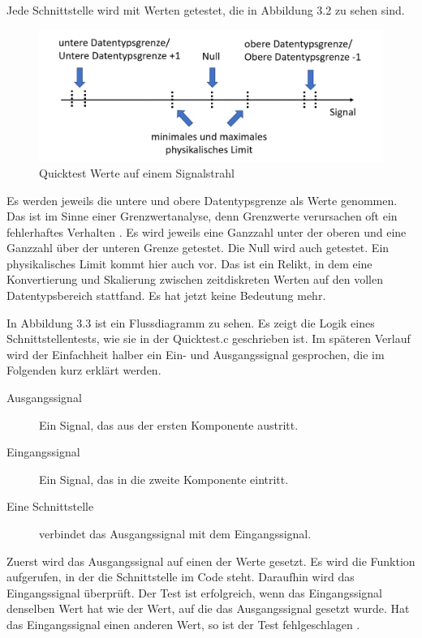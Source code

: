 Jede Schnittstelle wird mit Werten getestet, die in Abbildung 3.2 zu sehen sind.


\begin{figure}[h]
\centering
\includegraphics[scale=.9,]{Bilder/EquiZeitstrahl/QuicktestSignalstrahl.png}
\caption{Quicktest Werte auf einem Signalstrahl \parencite[]{quicktestc}}
\end{figure}
Es werden jeweils die untere und obere Datentypsgrenze als Werte genommen. Das ist im Sinne einer Grenzwertanalyse, denn
Grenzwerte verursachen oft ein fehlerhaftes Verhalten \parencite[S. 36]{integration}. 
Es wird jeweils eine Ganzzahl unter der oberen und eine Ganzzahl über der unteren Grenze getestet. Die Null wird auch getestet.
Ein physikalisches Limit kommt hier auch vor. Das ist ein Relikt, in dem eine Konvertierung und Skalierung zwischen zeitdiskreten Werten auf den vollen
Datentypsbereich stattfand. Es hat jetzt keine Bedeutung mehr.\par%

In Abbildung 3.3 ist ein Flussdiagramm zu sehen. Es zeigt die Logik eines Schnittstellentests, wie sie in der Quicktest.c 
geschrieben ist. 
Im späteren Verlauf wird der Einfachheit halber ein Ein- und Ausgangssignal gesprochen, die im Folgenden kurz erklärt werden.
\begin{description}
\item[Ausgangssignal] Ein Signal, das aus der ersten Komponente austritt.
\item[Eingangssignal] Ein Signal, das in die zweite Komponente eintritt.
\item[Eine Schnittstelle] verbindet das Ausgangssignal mit dem Eingangssignal.
\end{description}
Zuerst wird das Ausgangssignal auf einen der Werte gesetzt. Es wird die Funktion aufgerufen, in der
die Schnittstelle im Code steht. Daraufhin wird das Eingangssignal überprüft. Der Test ist erfolgreich, wenn 
das Eingangssignal denselben Wert hat wie der Wert, auf die das Ausgangssignal gesetzt wurde. Hat das Eingangssignal einen
anderen Wert, so ist der Test fehlgeschlagen \parencite[]{quicktestc}\parencite[]{quicktestlog}.

